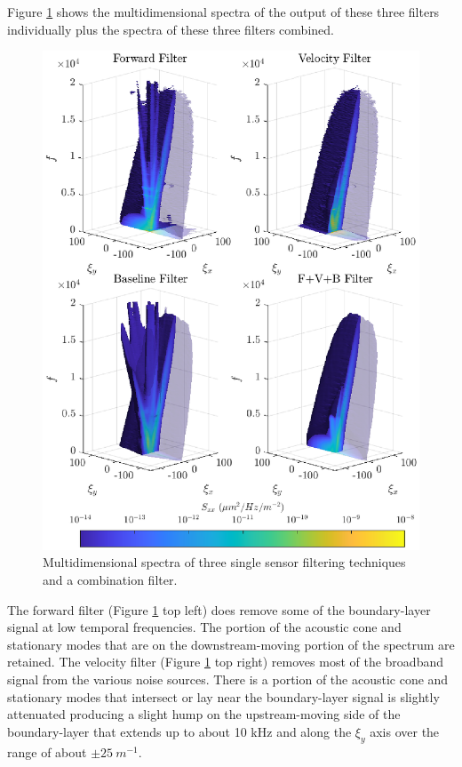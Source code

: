 Figure \ref{fig:08_dispersion_filters} shows the multidimensional spectra of the output of these three filters individually plus the spectra of these three filters combined.
\begin{figure}
  \centering
  \includegraphics{../matlab/08_conclusion/dispersion_filters.eps}
  \caption{Multidimensional spectra of three single sensor filtering techniques and a combination filter.}
  \label{fig:08_dispersion_filters}
\end{figure}
The forward filter (Figure \ref{fig:08_dispersion_filters} top left) does remove some of the boundary-layer signal at low temporal frequencies.
The portion of the acoustic cone and stationary modes that are on the downstream-moving portion of the spectrum are retained.
The velocity filter (Figure \ref{fig:08_dispersion_filters} top right) removes most of the broadband signal from the various noise sources.
There is a portion of the acoustic cone and stationary modes that intersect or lay near the boundary-layer signal is slightly attenuated producing a slight hump on the upstream-moving side of the boundary-layer that extends up to about 10 kHz and along the $\xi_y$ axis over the range of about $\pm25\ m^{-1}$.

